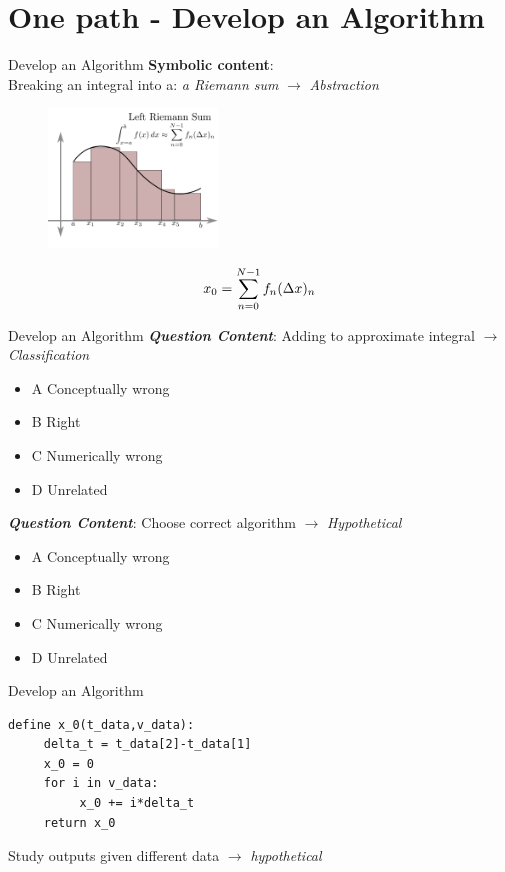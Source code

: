 \documentclass{beamer}
\begin{document}
\section{One path - Develop an Algorithm}

\begin{frame}{Develop an Algorithm}
\alert{\textbf{Symbolic content}}: \\ 
Breaking an integral into a: \textit{a Riemann sum} $\to$ \textit{\alert{Abstraction}} \vspace{0.5cm}
\begin{figure}
\centering
\includegraphics[width=0.4\textwidth]{figures/LeftRiemann.png}
\end{figure}
\begin{equation}
x_{\rm 0} = \sum_{n=0}^{N-1} f_n (\Delta x)_n
\end{equation}
\end{frame}

\begin{frame}{Develop an Algorithm}
\small
\textbf{\textit{Question Content}}: Adding to approximate integral $\to$ \textit{\alert{Classification}}
\begin{itemize}
\item A Conceptually wrong
\item B Right
\item C Numerically wrong
\item D Unrelated
\end{itemize}
\textbf{\textit{Question Content}}: Choose correct algorithm $\to$ \textit{\alert{Hypothetical}}
\begin{itemize}
\item A Conceptually wrong
\item B Right
\item C Numerically wrong
\item D Unrelated
\end{itemize}
\end{frame}

\begin{frame}[fragile]{Develop an Algorithm}
\begin{verbatim}
define x_0(t_data,v_data):
     delta_t = t_data[2]-t_data[1]
     x_0 = 0
     for i in v_data:
          x_0 += i*delta_t
     return x_0
\end{verbatim}
Study outputs given different data $\to$ \textit{\alert{hypothetical}}
\end{frame}
\end{document}
